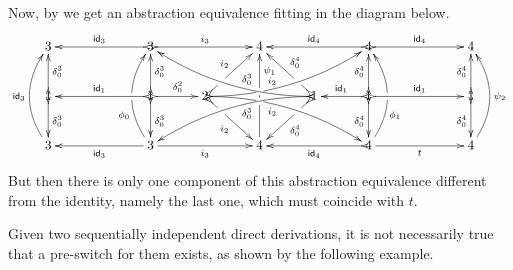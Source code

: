 \begin{example}
	Now, by  we get an abstraction equivalence fitting in the diagram below.
	\[\xymatrix@C=30pt@R=25pt{3 && \ar@{>->}[ll]_{\id{3}} 3 \ar@{>->}[rr]^{i_3}&& 4 && \ar@{>->}[ll]_{\id{4}} 4 \ar@{>->}[rr]^{\id{4}}&& 4\\1 \ar@{>->}[d]^{\delta^3_0} \ar@{>->}[u]_{\delta^3_0}&& 1 \ar@{>->}[d]^{\delta^3_0} \ar@{>->}[u]_{\delta^3_0}\ar@{>->}[ll]_{\id{1}} \ar@{>->}[r]^{\delta^2_0} & 2 \ar@{>->}@/^.35cm/[drrr]|(.315)\hole_(.4){i_2} \ar@{>->}[dr]|(.3)\hole_{i_2} \ar@{>->}@/_.35cm/[urrr]|(.315)\hole^(.4){i_2} \ar@{>->}[ur]|(.3)\hole^{i_2}& &1 \ar@{>->}@/_.35cm/[dlll]^(.4){\delta^3_0} \ar@{>->}[dl]|(.3)\hole^{\delta^4_0} \ar@{>->}@/^.35cm/[ulll]_(.4){\delta^3_0} \ar@{>->}[ul]|(.3)\hole_{\delta^4_0}& 1 \ar@{>->}[d]_{\delta^4_0} \ar@{>->}[u]^{\delta^4_0}\ar@{>->}[l]_{\id{1}} \ar@{>->}[rr]^{\id{1}} && 1 \ar@{>->}[d]_{\delta^4_0} \ar@{>->}[u]^{\delta^4_0}\\ \ar@/^.5cm/[uu]^{\id{3}} 3 && \ar[ll]^{\id{3}} 3 \ar@{>}@/^.5cm/[uu]^(.33){\phi_0}|\hole \ar[rr]_{i_3}&& 4 \ar@{>}[uu]_(.76){\psi_1}|(.45)\hole |(.55)\hole&& \ar@{>->}[ll]^{\id{4}} 4 \ar@{>}@/_.5cm/[uu]_(.33){\phi_1}|\hole\ar[rr]_{t}&& 4\ar@{>}@/_.5cm/[uu]_{\psi_2}}\]
	But then there is only one component of this abstraction equivalence different from the identity, namely the last one, which must coincide with $t$.
\end{example}

Given two sequentially independent direct derivations, it is not necessarily true that a pre-switch for them exists, as shown by the following example. 

